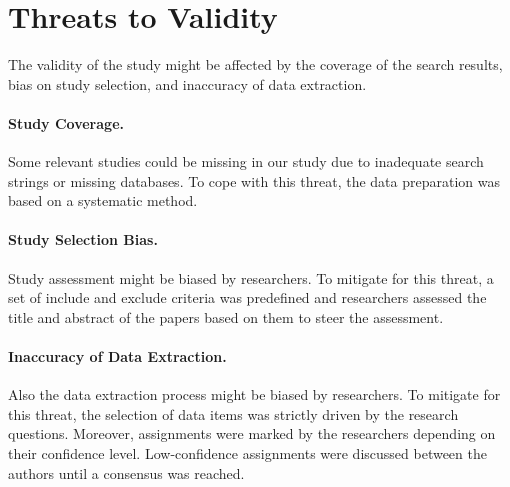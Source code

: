 \section{Threats to Validity}
\label{sec:threats_to_validity}

The validity of the study might be affected by the coverage of the search results, bias on study selection, and inaccuracy of data extraction.
\paragraph{Study Coverage.}
Some relevant studies could be missing in our study due to inadequate search strings or missing databases.
To cope with this threat, the data preparation was based on a systematic method.
\vspace{-5pt}
\paragraph{Study Selection Bias.}
Study assessment might be biased by researchers.
To mitigate for this threat, a set of include and exclude criteria was predefined and researchers assessed the title and abstract of the papers based on them to steer the assessment.
\vspace{-5pt}
\paragraph{Inaccuracy of Data Extraction.}
Also the data extraction process might be biased by researchers.
To mitigate for this threat, the selection of data items was strictly driven by the research questions.
Moreover, assignments were marked by the researchers depending on their confidence level. Low-confidence assignments were discussed between the authors until a consensus was reached.